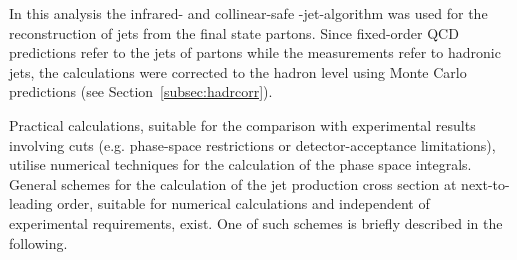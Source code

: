 In this analysis the infrared- and collinear-safe \kt-jet-algorithm was used for the reconstruction of jets from the final state partons. Since fixed-order QCD predictions refer to the jets of partons while the measurements refer to hadronic jets, the calculations were corrected to the hadron level using Monte Carlo predictions (see Section~\ref{subsec:hadrcorr}).

Practical calculations, suitable for the comparison with experimental results involving cuts (e.g. phase-space restrictions or detector-acceptance limitations), utilise numerical techniques for the calculation of the phase space integrals. General schemes for the calculation of the jet production cross section at next-to-leading order, suitable for numerical calculations and independent of experimental requirements, exist. One of such schemes is briefly described in the following. 